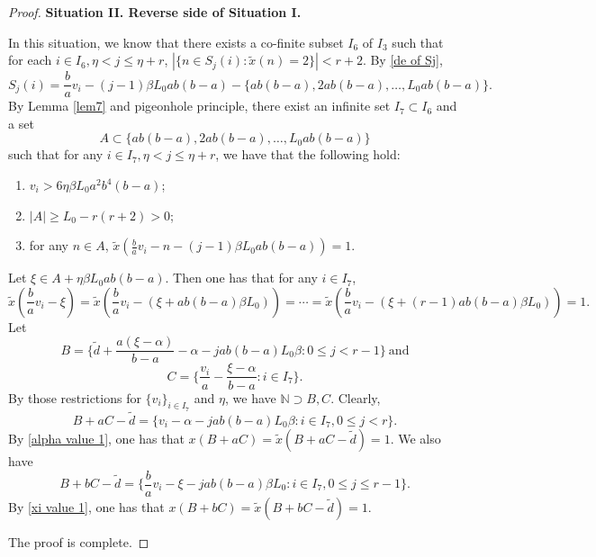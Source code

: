 \documentclass[reqno,12pt]{amsart}
\def \N {\mathbb N}
\numberwithin{equation}{section}
\begin{document}
\begin{proof}
	\noindent \textbf{Situation II. Reverse side of Situation I.}
	
	In this situation, we know that there exists a co-finite subset $I_6$ of $I_3$ such that for each $i\in I_6,\eta< j\le \eta+r$, $|\{n\in S_j(i):\tilde{x}(n)=2\}|< r+2$. By \eqref{de of Sj},
$$S_j(i)=\frac{b}{a}v_i-(j-1)\beta L_0 ab(b-a)-\{ab(b-a),2ab(b-a),\ldots,L_0ab(b-a)\}. $$
By Lemma \ref{lem7} and pigeonhole principle, there exist an infinite set $I_7\subset I_6$ and a set $$A\subset \{ab(b-a),2ab(b-a),\ldots,L_0ab(b-a)\}$$
 such that for any $i\in I_7, \eta<  j\leq  \eta+r$, we have that the following hold:
 \begin{enumerate}
   \item $v_i>6\eta \beta L_0a^2b^4(b-a)$;
   \item $|A|\geq  L_0-r(r+2)>0$;
   \item for any $n\in A$, $\tilde{x}(\frac{b}{a}v_i-n-(j-1)\beta L_0 ab(b-a))=1$.
 \end{enumerate}
 Let $\xi\in A+\eta \beta L_0 ab(b-a)$. Then one has that for any $i\in I_7$,
\begin{equation}\label{xi value 1}\tilde{x}(\frac{b}{a}v_i-\xi)=\tilde{x}(\frac{b}{a}v_i-(\xi+ab(b-a)\beta  L_0))=\cdots=\tilde{x}(\frac{b}{a}v_i-(\xi+(r-1)ab(b-a)\beta L_0))=1.
\end{equation}
	Let $$B=\Big\{\tilde{d}+\frac{a(\xi-\alpha)}{b-a}-\alpha-jab(b-a)L_{0}\beta:0\le j<r-1\Big\}\ \text{and}$$ $$C=\Big\{\frac{v_{i}}{a}-\frac{\xi-\alpha}{b-a}:i\in I_7\Big\}.$$
By those restrictions for $\{v_i\}_{i\in I_7}$ and $\eta$, we have $\N\supset B,C$. Clearly,
$$B+aC-\tilde{d}=\{v_{i}-\alpha-jab(b-a)L_0\beta:i\in I_7,0\le  j< r\}.$$
By \eqref{alpha value 1}, one has that $x(B+aC)=\tilde{x}(B+aC-\tilde{d})=1$. We also have
$$B+bC-\tilde{d}=\{\frac{b}{a}v_i-\xi-jab(b-a)\beta  L_0:i\in I_7,0\leq j\leq r-1\}.$$
By \eqref{xi value 1}, one has that $x(B+bC)=\tilde{x}(B+bC-\tilde{d})=1$.

The proof is complete.
\end{proof}
\end{document}
